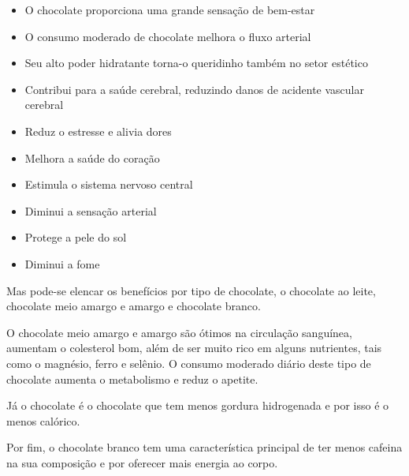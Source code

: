 \documentclass[
	12pt,				%
	openright,			%
	oneside,			%
	a4paper,			%
	english,			%
	french,				%
	spanish,			%
	brazil				%
	]{abntex2}
\begin{document}
\begin{itemize}
\item O chocolate proporciona uma grande sensação de bem-estar
\item O consumo moderado de chocolate melhora o fluxo arterial 
\item Seu alto poder hidratante torna-o queridinho também no setor estético
\item Contribui para a saúde cerebral, reduzindo danos de acidente vascular cerebral
\item Reduz o estresse e alivia dores 
\item Melhora a saúde do coração
\item Estimula o sistema nervoso central
\item Diminui a sensação arterial
\item Protege a pele do sol
\item Diminui a fome
\end{itemize}

Mas pode-se elencar os benefícios por tipo de chocolate, o chocolate ao leite, chocolate meio amargo e amargo e chocolate branco.

O chocolate meio amargo e amargo são ótimos na circulação sanguínea, aumentam o colesterol bom, além de ser muito rico em alguns nutrientes, tais como o magnésio, ferro e selênio. O consumo moderado diário deste tipo de chocolate aumenta o metabolismo e reduz o apetite. \cite{saude}
	
Já o chocolate é o chocolate que tem menos gordura hidrogenada e por isso é o menos calórico.
	
Por fim, o chocolate branco tem uma característica principal de ter menos cafeina na sua composição e por oferecer mais energia ao corpo. \cite{saude}
\end{document}
